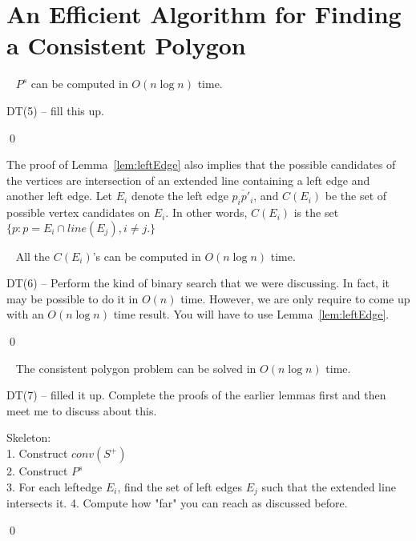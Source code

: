\documentclass[fullpage,my,12pt]{article}
\begin{document}
\section{An Efficient Algorithm for Finding a Consistent Polygon}

\begin{lemma}~\label{lem:compStar}
$P^s$ can be computed in $O(n \log n)$ time.
\end{lemma}
\pf
DT(5) -- fill this up.

\qed

The proof of Lemma~\ref{lem:leftEdge} also implies that the
possible candidates of the vertices are intersection of an
extended line containing a left edge and another left edge. Let
$E_i$ denote the left edge $\overline{p_ip'_i}$, and $C(E_i)$ be
the set of possible vertex candidates on $E_i$. In other words,
$C(E_i)$ is the set $\{p: p = E_i \cap line(E_j), i\not=j. \}$

\begin{lemma}~\label{lem:compCandidate}
All the $C(E_i)$'s can be computed in $O(n \log n)$ time.
\end{lemma}
\pf
DT(6) -- Perform the kind of binary search that we were
discussing. In fact, it may be possible to do it in $O(n)$ time.
However, we are only require to come up with an $O(n \log n)$
time result. You will have to use Lemma~\ref{lem:leftEdge}.

\qed

\begin{theorem}~\label{thm:consistent}
The consistent polygon problem can be solved in $O(n \log n)$
time.
\end{theorem}
\pf
DT(7) -- filled it up. Complete the proofs of the earlier lemmas
first and then meet me to discuss about this.


Skeleton: \\
1. Construct $conv(S^+)$ \\
2. Construct $P^s$ \\
3. For each leftedge $E_i$, find the set of left edges $E_j$ such
that the extended line intersects it.
4. Compute how "far" you can reach as discussed before.

\qed
\end{document}
